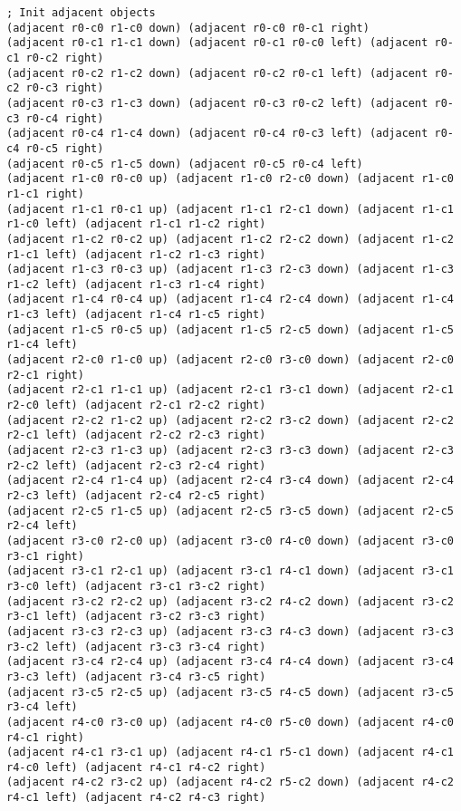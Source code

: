 \documentclass{article}
\begin{document}
\begin{Verbatim}[commandchars=\\\{\}]
; Init adjacent objects
(adjacent r0-c0 r1-c0 down) (adjacent r0-c0 r0-c1 right) 
(adjacent r0-c1 r1-c1 down) (adjacent r0-c1 r0-c0 left) (adjacent r0-c1 r0-c2 right) 
(adjacent r0-c2 r1-c2 down) (adjacent r0-c2 r0-c1 left) (adjacent r0-c2 r0-c3 right) 
(adjacent r0-c3 r1-c3 down) (adjacent r0-c3 r0-c2 left) (adjacent r0-c3 r0-c4 right) 
(adjacent r0-c4 r1-c4 down) (adjacent r0-c4 r0-c3 left) (adjacent r0-c4 r0-c5 right) 
(adjacent r0-c5 r1-c5 down) (adjacent r0-c5 r0-c4 left) 
(adjacent r1-c0 r0-c0 up) (adjacent r1-c0 r2-c0 down) (adjacent r1-c0 r1-c1 right) 
(adjacent r1-c1 r0-c1 up) (adjacent r1-c1 r2-c1 down) (adjacent r1-c1 r1-c0 left) (adjacent r1-c1 r1-c2 right) 
(adjacent r1-c2 r0-c2 up) (adjacent r1-c2 r2-c2 down) (adjacent r1-c2 r1-c1 left) (adjacent r1-c2 r1-c3 right) 
(adjacent r1-c3 r0-c3 up) (adjacent r1-c3 r2-c3 down) (adjacent r1-c3 r1-c2 left) (adjacent r1-c3 r1-c4 right) 
(adjacent r1-c4 r0-c4 up) (adjacent r1-c4 r2-c4 down) (adjacent r1-c4 r1-c3 left) (adjacent r1-c4 r1-c5 right) 
(adjacent r1-c5 r0-c5 up) (adjacent r1-c5 r2-c5 down) (adjacent r1-c5 r1-c4 left) 
(adjacent r2-c0 r1-c0 up) (adjacent r2-c0 r3-c0 down) (adjacent r2-c0 r2-c1 right) 
(adjacent r2-c1 r1-c1 up) (adjacent r2-c1 r3-c1 down) (adjacent r2-c1 r2-c0 left) (adjacent r2-c1 r2-c2 right) 
(adjacent r2-c2 r1-c2 up) (adjacent r2-c2 r3-c2 down) (adjacent r2-c2 r2-c1 left) (adjacent r2-c2 r2-c3 right) 
(adjacent r2-c3 r1-c3 up) (adjacent r2-c3 r3-c3 down) (adjacent r2-c3 r2-c2 left) (adjacent r2-c3 r2-c4 right) 
(adjacent r2-c4 r1-c4 up) (adjacent r2-c4 r3-c4 down) (adjacent r2-c4 r2-c3 left) (adjacent r2-c4 r2-c5 right) 
(adjacent r2-c5 r1-c5 up) (adjacent r2-c5 r3-c5 down) (adjacent r2-c5 r2-c4 left) 
(adjacent r3-c0 r2-c0 up) (adjacent r3-c0 r4-c0 down) (adjacent r3-c0 r3-c1 right) 
(adjacent r3-c1 r2-c1 up) (adjacent r3-c1 r4-c1 down) (adjacent r3-c1 r3-c0 left) (adjacent r3-c1 r3-c2 right) 
(adjacent r3-c2 r2-c2 up) (adjacent r3-c2 r4-c2 down) (adjacent r3-c2 r3-c1 left) (adjacent r3-c2 r3-c3 right) 
(adjacent r3-c3 r2-c3 up) (adjacent r3-c3 r4-c3 down) (adjacent r3-c3 r3-c2 left) (adjacent r3-c3 r3-c4 right) 
(adjacent r3-c4 r2-c4 up) (adjacent r3-c4 r4-c4 down) (adjacent r3-c4 r3-c3 left) (adjacent r3-c4 r3-c5 right) 
(adjacent r3-c5 r2-c5 up) (adjacent r3-c5 r4-c5 down) (adjacent r3-c5 r3-c4 left) 
(adjacent r4-c0 r3-c0 up) (adjacent r4-c0 r5-c0 down) (adjacent r4-c0 r4-c1 right) 
(adjacent r4-c1 r3-c1 up) (adjacent r4-c1 r5-c1 down) (adjacent r4-c1 r4-c0 left) (adjacent r4-c1 r4-c2 right) 
(adjacent r4-c2 r3-c2 up) (adjacent r4-c2 r5-c2 down) (adjacent r4-c2 r4-c1 left) (adjacent r4-c2 r4-c3 right) 

\end{Verbatim}
\end{document}
